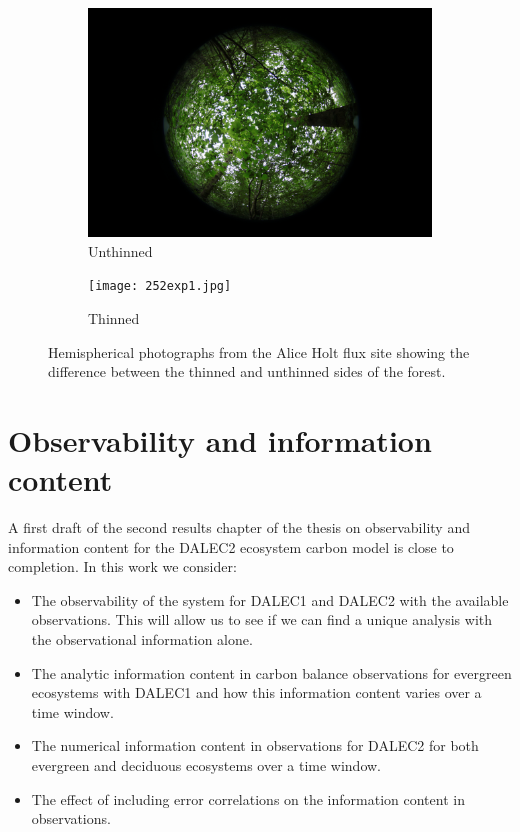 \documentclass[11pt]{article}
\begin{document}
\begin{figure}[!h]
\centering
\begin{subfigure}{.5\textwidth}
  \centering
  \includegraphics[width=.7\linewidth]{043exp2.jpg}
  \caption{Unthinned}
  \label{fig:sub1}
\end{subfigure}%
\begin{subfigure}{.5\textwidth}
  \centering
  \texttt{[image: 252exp1.jpg]}
  \caption{Thinned}
  \label{fig:sub2}
\end{subfigure}
\caption{Hemispherical photographs from the Alice Holt flux site showing the difference between the thinned and unthinned sides of the forest.}
\label{fig:hemiphotos}
\end{figure}

\section{Observability and information content}

A first draft of the second results chapter of the thesis on observability and information content for the DALEC2 ecosystem carbon model is close to completion. In this work we consider:
\begin{itemize}
\item The observability of the system for DALEC1 and DALEC2 with the available observations. This will allow us to see if we can find a unique analysis with the observational information alone.
\item The analytic information content in carbon balance observations for evergreen ecosystems with DALEC1 and how this information content varies over a time window.
\item The numerical information content in observations for DALEC2 for both evergreen and deciduous ecosystems over a time window.
\item The effect of including error correlations on the information content in observations.
\end{itemize}
\end{document}
